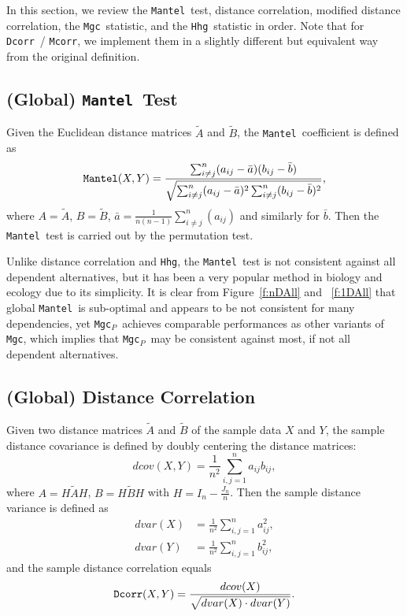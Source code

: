 \documentclass[11pt]{article}
\providecommand{\sct}[1]{{\sc \texttt{#1}}}
\newcommand{\Mgc}{\sct{Mgc}}
\newcommand{\Mgcp}{\sct{Mgc$_P$}}
\newcommand{\Hhg}{\sct{Hhg}}
\newcommand{\Dcorr}{\sct{Dcorr}}
\newcommand{\Mcorr}{\sct{Mcorr}}
\newcommand{\Mantel}{\sct{Mantel}}
\begin{document}
In this section, we review the \Mantel~test, distance correlation, modified distance correlation, the \Mgc~statistic, and the \Hhg~statistic in order. Note that for \Dcorr~/ \Mcorr, we implement them in a slightly different but equivalent way from the original definition.

\subsection{(Global) \Mantel~Test}
\label{appen:mantel}
Given the Euclidean distance matrices $\tilde{A}$ and $\tilde{B}$, the \Mantel~coefficient \cite{Mantel1967} is defined as
\begin{equation}
\Mantel(X,Y)=\frac{\sum_{i \neq j}^{n}(a_{ij}-\bar{a})(b_{ij}-\bar{b})}{\sqrt{\sum_{i \neq j}^{n}(a_{ij}-\bar{a})^2 \sum_{i \neq j}^{n}(b_{ij}-\bar{b})^2}},
\end{equation}
where $A=\tilde{A}$, $B=\tilde{B}$, $\bar{a}=\frac{1}{n(n-1)}\sum_{i \neq j}^{n}(a_{ij})$ and similarly for $\bar{b}$. Then the \Mantel~test is carried out by the permutation test.

Unlike distance correlation and \Hhg, the \Mantel~test is not consistent against all dependent alternatives, but it has been a very popular method in biology and ecology due to its simplicity. It is clear from Figure~\ref{f:nDAll} and ~\ref{f:1DAll} that global \Mantel~is sub-optimal and appears to be not consistent for many dependencies, yet \Mgcp~achieves comparable performances as other variants of \Mgc, which implies that \Mgcp~may be consistent against most, if not all dependent alternatives.

\subsection{(Global) Distance Correlation}
\label{appen:dcorr}
Given two distance matrices $\tilde{A}$ and $\tilde{B}$ of the sample data $X$ and $Y$, the sample distance covariance is defined by doubly centering the distance matrices:
\begin{equation}
\label{dcovEqu}
dcov(X,Y)=\frac{1}{n^2}\sum_{i,j=1}^{n}a_{ij}b_{ij},
\end{equation}
where $A=H\tilde{A}H$, $B=H\tilde{B}H$ with $H=I_{n}-\frac{J_{n}}{n}$. Then the sample distance variance is defined as
\begin{align*}
dvar(X) &=\frac{1}{n^2}\sum_{i,j=1}^{n}a_{ij}^{2},\\
dvar(Y) &=\frac{1}{n^2}\sum_{i,j=1}^{n}b_{ij}^{2},
\end{align*}
and the sample distance correlation equals
\begin{equation}
\label{dcorrEqu}
\Dcorr(X,Y)=\frac{dcov(X)}{\sqrt{dvar(X) \cdot dvar(Y)}}.
\end{equation}
\end{document}
